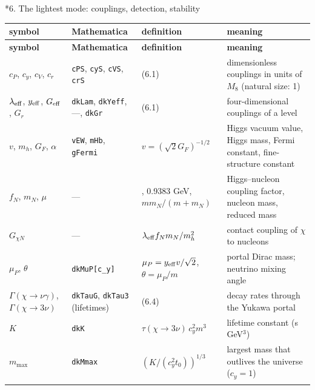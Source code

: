 \documentclass[10pt,a4paper]{article}
\makeatletter
\renewcommand\section{\@startsection{section}{1}{\z@}{-3.5ex \@plus -1ex \@minus -.2ex}{2.3ex \@plus.2ex}{\normalfont\Large\bfseries\raggedright}}
\makeatother
\begin{document}
\section*{6. The lightest mode: couplings, detection, stability}
{\small
\begin{longtable}{>{\raggedright\arraybackslash}p{}>{\raggedright\arraybackslash}p{}>{\raggedright\arraybackslash}p{}>{\raggedright\arraybackslash}p{}}
\toprule
\textbf{symbol} & \textbf{Mathematica} & \textbf{definition} & \textbf{meaning} \\
\midrule\endfirsthead
\toprule
\textbf{symbol} & \textbf{Mathematica} & \textbf{definition} & \textbf{meaning} \\
\midrule\endhead
\endfoot
\bottomrule\endlastfoot
$c_P$, $c_y$, $c_V$, $c_r$ & \texttt{cPS}, \texttt{cyS}, \texttt{cVS}, \texttt{crS} & (6.1) & dimensionless couplings in units of $M_8$ (natural size: 1) \\
$\lambda_{\rm eff}$, $y_{\rm eff}$, $G_{\rm eff}$, $G_r$ & \texttt{dkLam}, \texttt{dkYeff}, —, \texttt{dkGr} & (6.1) & four-dimensional couplings of a level \\
$v$, $m_h$, $G_F$, $\alpha$ & \texttt{vEW}, \texttt{mHb}, \texttt{gFermi} & $v=(\sqrt2G_F)^{-1/2}$ & Higgs vacuum value, Higgs mass, Fermi constant, fine-structure constant \\
$f_N$, $m_N$, $\mu$ & — & 0.30, 0.9383 GeV, $mm_N/(m+m_N)$ & Higgs–nucleon coupling factor, nucleon mass, reduced mass \\
$G_{\chi N}$ & — & $\lambda_{\rm eff}f_Nm_N/m_h^2$ & contact coupling of $\chi$ to nucleons \\
$\mu_P$, $\theta$ & \texttt{dkMuP[c\_\allowbreak{}y]} & $\mu_P=y_{\rm eff}v/\sqrt2$, $\theta=\mu_P/m$ & portal Dirac mass; neutrino mixing angle \\
$\Gamma(\chi\to\nu\gamma)$, $\Gamma(\chi\to3\nu)$ & \texttt{dkTauG}, \texttt{dkTau3} (lifetimes) & (6.4) & decay rates through the Yukawa portal \\
$K$ & \texttt{dkK} & $\tau(\chi\to3\nu)\,c_y^2m^3$ & lifetime constant (s GeV$^3$) \\
$m_{\max}$ & \texttt{dkMmax} & $(K/(c_y^2t_0))^{1/3}$ & largest mass that outlives the universe ($c_y=1$) \\*
\end{longtable}}
\end{document}
